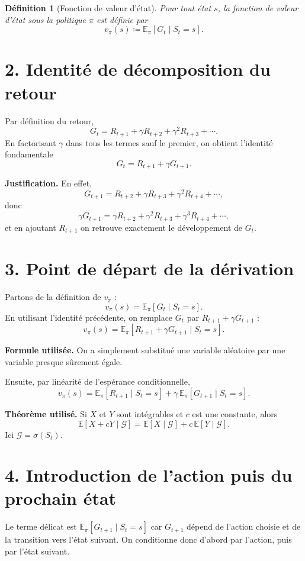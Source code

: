 \documentclass[11pt,a4paper]{article}
\newtheorem{definition}{Définition}
\begin{document}
\begin{definition}[Fonction de valeur d'état]
Pour tout état $s$, la fonction de valeur d'état sous la politique $\pi$ est définie par
\[
v_\pi(s) \coloneqq \mathbb E_\pi[G_t\mid S_t=s].
\]
\end{definition}

\section*{2. Identité de décomposition du retour}

Par définition du retour,
\[
G_t = R_{t+1} + \gamma R_{t+2} + \gamma^2 R_{t+3} + \cdots.
\]
En factorisant $\gamma$ dans tous les termes sauf le premier, on obtient l'identité fondamentale
\[
G_t = R_{t+1} + \gamma G_{t+1}.
\]

\textbf{Justification.}
En effet,
\[
G_{t+1}=R_{t+2}+\gamma R_{t+3}+\gamma^2R_{t+4}+\cdots,
\]
donc
\[
\gamma G_{t+1}=\gamma R_{t+2}+\gamma^2R_{t+3}+\gamma^3R_{t+4}+\cdots,
\]
et en ajoutant $R_{t+1}$ on retrouve exactement le développement de $G_t$.

\section*{3. Point de départ de la dérivation}

Partons de la définition de $v_\pi$ :
\[
v_\pi(s)=\mathbb E_\pi[G_t\mid S_t=s].
\]
En utilisant l'identité précédente, on remplace $G_t$ par $R_{t+1}+\gamma G_{t+1}$ :
\[
v_\pi(s)=\mathbb E_\pi[R_{t+1}+\gamma G_{t+1}\mid S_t=s].
\]

\textbf{Formule utilisée.}
On a simplement substitué une variable aléatoire par une variable presque sûrement égale.

Ensuite, par linéarité de l'espérance conditionnelle,
\[
v_\pi(s)=\mathbb E_\pi[R_{t+1}\mid S_t=s] + \gamma\,\mathbb E_\pi[G_{t+1}\mid S_t=s].
\]

\textbf{Théorème utilisé.}
Si $X$ et $Y$ sont intégrables et $c$ est une constante, alors
\[
\mathbb E[X+cY\mid \mathcal G]=\mathbb E[X\mid \mathcal G] + c\,\mathbb E[Y\mid \mathcal G].
\]
Ici $\mathcal G=\sigma(S_t)$.

\section*{4. Introduction de l'action puis du prochain état}

Le terme délicat est $\mathbb E_\pi[G_{t+1}\mid S_t=s]$ car $G_{t+1}$ dépend de l'action choisie et de la transition vers l'état suivant. On conditionne donc d'abord par l'action, puis par l'état suivant.
\end{document}
